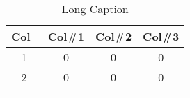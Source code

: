 \begin{table}
	\caption[Short Caption]{Long Caption}
	\centering
	\begin{tabular}{c c c c}
		\hline\hline
		Col\ & Col\#1 & Col\#2 & Col\#3 \\ [0.5ex]
		\hline
		1 & 0 & 0 & 0\\
		2 & 0 & 0 & 0 \\ [1ex]
		\hline
		\label{table:ex}
	\end{tabular}
\end{table}